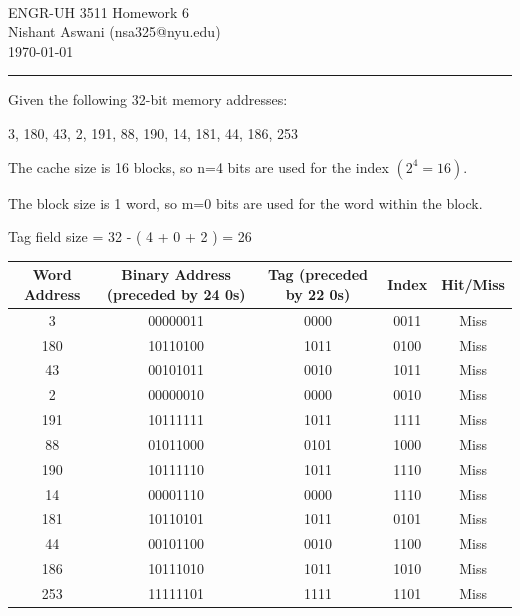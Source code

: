 \documentclass[11pt]{exam}
\makeatletter
\newcommand{\myname}{Nishant Aswani}
\newcommand{\myemail}{nsa325@nyu.edu}
\newcommand{\myhwtype}{Homework}
\newcommand{\myhwnum}{6}
\newcommand{\mycoursenumber}{ENGR-UH 3511}
\newcounter{questionCounter}
\newcounter{partCounter}[questionCounter]
\newenvironment{namedquestion}[1]{%
    \addtocounter{questionCounter}{1}%
    \setcounter{partCounter}{0}%
    \vspace{.2in}%
        \noindent{\bf #1}%
    \vspace{0.3em} \hrule \vspace{.1in}%
}{}
\makeatother
\begin{document}
\

{\newpage}


\thispagestyle{plain}
\begin{center}
  {\Large \mycoursenumber{} \myhwtype{} \myhwnum} \\
  \myname{} (\myemail{}) \\
  \today
\end{center}

\setcounter{questionCounter}{0}

\begin{namedquestion}{Question 5.2.1}

Given the following 32-bit memory addresses: 

\begin{lstlistings}
3, 180, 43, 2, 191, 88, 190, 14, 181, 44, 186, 253 
\end{lstlistings}

\medskip

The cache size is 16 blocks, so n=4 bits are used for the index $(2^4 =16)$. 

The block size is 1 word, so m=0 bits are used for the word within the block. 

Tag field size = 32 - ( 4 + 0 + 2 ) = 26

\begingroup
    \medskip
    \centering
    \def\arraystretch{1.5}
        \begin{tabular}{ccccc}
            \toprule
            Word Address & Binary Address (preceded by 24 0s) & Tag (preceded by 22 0s) & Index & Hit/Miss\\
            \midrule
             3    & 00000011 & 0000 & 0011 & Miss\\
             180  & 10110100 & 1011 & 0100 & Miss\\
             43   & 00101011 & 0010 & 1011 & Miss\\
             2    & 00000010 & 0000 & 0010 & Miss\\
             191  & 10111111 & 1011 & 1111 & Miss\\
             88   & 01011000 & 0101 & 1000 & Miss\\
             190  & 10111110 & 1011 & 1110 & Miss\\
             14   & 00001110 & 0000 & 1110 & Miss\\
             181  & 10110101 & 1011 & 0101 & Miss\\
             44   & 00101100 & 0010 & 1100 & Miss\\
             186  & 10111010 & 1011 & 1010 & Miss\\
             253  & 11111101 & 1111 & 1101 & Miss\\
            \bottomrule
        \end{tabular}
    \label{fig:cacheTable}
    \medskip
\endgroup


\end{namedquestion}
\end{document}
